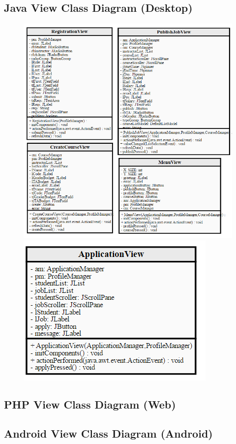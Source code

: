 \documentclass[12pt]{article}
\begin{document}
\subsection{Java View Class Diagram (Desktop)}
\begin{figure}[H]
	\centering
	\includegraphics[scale=1]{./ClassDiagrams/desktopViewPackageDiagram(A).png}
	\includegraphics[scale=1]{./ClassDiagrams/desktopViewPackageDiagram(B).png}
\end{figure}
\subsection{PHP View Class Diagram (Web)}
\subsection{Android View Class Diagram (Android)}
\end{document}
